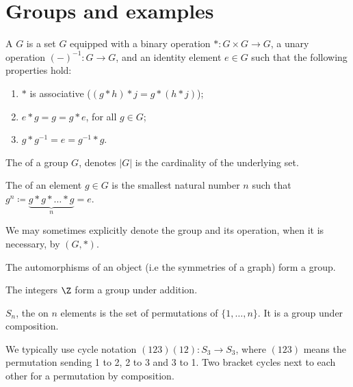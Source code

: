 \documentclass[12pt]{report}
\begin{document}
\section{Groups and examples}

\begin{definition}\label{def:intro-to-group-theory:group}
  A  \(G\) is a set \(G\) equipped with a binary operation \(* : G \times G \to G\), a unary operation \((-)^{-1}: G \to G\), and an identity element \(e \in G\) such that the following properties hold:

  \begin{enumerate}
    \item \(*\) is associative (\((g * h) * j = g * (h * j)\));
    \item \(e * g = g = g * e\), for all \(g \in G\);
    \item \(g * g^{-1} = e = g^{-1} * g\).
  \end{enumerate}

  The  of a group \(G\), denotes \(|G|\) is the cardinality of the underlying set.

  The  of an element \(g \in G\) is the smallest natural number \(n\) such that \(g^{n} \coloneqq \underbrace{g * g * \ldots * g}_{n} = e\).
\end{definition}


We may sometimes explicitly denote the group and its operation, when it is necessary, by \((G, *)\).

\begin{example}
  The automorphisms of an object (i.e the symmetries of a graph) form a group.
\end{example}


\begin{example}
  The integers \(\Z\) form a group under addition.
\end{example}


\begin{example}\label{ex:group-theory:symmetric-group}
  \(S_{n}\), the  on \(n\) elements is the set of permutations of \(\{1, \ldots, n\}\).
  It is a group under composition.


  We typically use cycle notation \((123)(12): S_{3} \to S_{3}\), where \((123)\) means the permutation sending 1 to 2, 2 to 3 and 3 to 1.
  Two bracket cycles next to each other for a permutation by composition.
\end{example}
\end{document}
